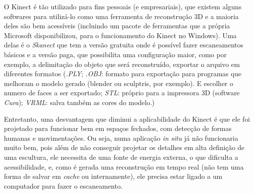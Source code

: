 O Kinect é tão utilizado para fins pessoais (e empresariais), que existem alguns softwares para utilizá-lo como uma ferramenta de reconstrução 3D e a maioria deles são bem acessíveis (incluindo um pacote de ferramentas que a própria Microsoft disponibilizou, para o funcionamento do Kinect no Windows). Uma delas é o \emph{Skanect} que tem a versão gratuita onde é possível fazer escaneamentos básicos e a versão paga, que possibilita uma configuração maior, como por exemplo, a delimitação do objeto que será reconstruído, exportar o arquivo em diferentes formatos (\emph{.PLY}; \emph{.OBJ}: formato para exportação para programas que melhoram o modelo gerado (blender ou sculptris, por exemplo). E escolher o numero de faces a ser exportado; \emph{STL}: próprio para a impressora 3D (software \emph{Cura}); \emph{VRML}: salva também as cores do modelo.)

Entretanto, uma desvantagem que diminui a aplicabilidade do Kinect é que ele foi projetado para funcionar bem em espaços fechados, com detecção de formas humanas e movimentações. Ou seja, numa aplicação \emph{in situ} já não funcionaria muito bem, pois além de não conseguir projetar os detalhes em alta definição de uma escultura, ele necessita de uma fonte de energia externa, o que dificulta a acessibilidade, e, como  é gerada uma reconstrução em tempo real (não tem uma forma de salvar em \emph{cache} ou internamente), ele precisa estar ligado a um computador para fazer o escaneamento.
